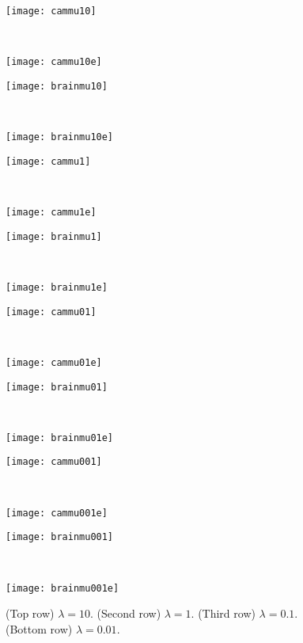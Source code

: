 \begin{figure}[htb!]
	\centering
	
	\begin{minipage}{0.23\textwidth}
		\texttt{[image: cammu10]}
	\end{minipage}\,
	\begin{minipage}{0.23\textwidth}
		\texttt{[image: cammu10e]}
	\end{minipage}\quad 
	\begin{minipage}{0.23\textwidth}
		\texttt{[image: brainmu10]}
	\end{minipage}\,
	\begin{minipage}{0.23\textwidth}
		\texttt{[image: brainmu10e]}
	\end{minipage}
	
	\begin{minipage}{0.23\textwidth}
		\texttt{[image: cammu1]}
	\end{minipage}\,
	\begin{minipage}{0.23\textwidth}
		\texttt{[image: cammu1e]}
	\end{minipage}\quad 
	\begin{minipage}{0.23\textwidth}
		\texttt{[image: brainmu1]}
	\end{minipage}\,
	\begin{minipage}{0.23\textwidth}
		\texttt{[image: brainmu1e]}
	\end{minipage}
	
	\begin{minipage}{0.23\textwidth}
		\texttt{[image: cammu01]}
	\end{minipage}\,
	\begin{minipage}{0.23\textwidth}
		\texttt{[image: cammu01e]}
	\end{minipage}\quad
	\begin{minipage}{0.23\textwidth}
		\texttt{[image: brainmu01]}
	\end{minipage}\,
	\begin{minipage}{0.23\textwidth}
		\texttt{[image: brainmu01e]}
	\end{minipage}
	
	\begin{minipage}{0.23\textwidth}
		\texttt{[image: cammu001]}
	\end{minipage}\,
	\begin{minipage}{0.23\textwidth}
		\texttt{[image: cammu001e]}
	\end{minipage}\quad 
	\begin{minipage}{0.23\textwidth}
		\texttt{[image: brainmu001]}
	\end{minipage}\,
	\begin{minipage}{0.23\textwidth}
		\texttt{[image: brainmu001e]}
	\end{minipage}
	\caption{(Top row) $\lambda = 10$. (Second row) $\lambda = 1$. (Third row) $\lambda = 0.1$. (Bottom row) $\lambda = 0.01$. }
	\label{fig:diff_lam}
\end{figure}
